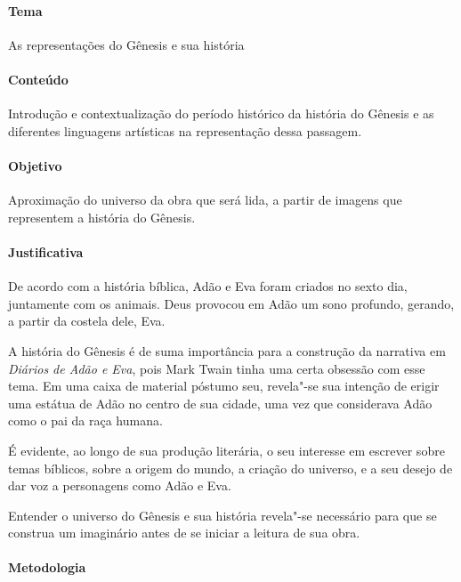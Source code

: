 \documentclass[12pt]{extarticle}
\begin{document}
\paragraph{Tema} As representações do Gênesis e sua história

\paragraph{Conteúdo} Introdução e contextualização do período histórico
da história do Gênesis e as diferentes linguagens
artísticas na representação dessa passagem.

\paragraph{Objetivo} Aproximação do universo da obra que será lida, a partir 
de imagens que representem a história do Gênesis. 

\paragraph{Justificativa} De acordo com a história bíblica, Adão e Eva foram 
criados no sexto dia, juntamente com os animais. Deus provocou em Adão um sono 
profundo, gerando, a partir da costela dele, Eva. 

A história do Gênesis é de suma importância para a construção da narrativa em 
\emph{Diários de Adão e Eva}, pois Mark Twain tinha uma certa obsessão com esse 
tema. Em uma caixa de material póstumo seu, revela"-se sua intenção de erigir 
uma estátua de Adão no centro de sua cidade, uma vez que considerava Adão como o 
pai da raça humana. 

É evidente, ao longo de sua produção literária, o seu
interesse em escrever sobre temas bíblicos, sobre a origem
do mundo, a criação do universo, e a seu desejo de dar
voz a personagens como Adão e Eva. 

Entender o universo do Gênesis e sua história revela"-se necessário para que 
se construa um imaginário antes de se iniciar a leitura de sua obra. 

\paragraph{Metodologia}
\end{document}
